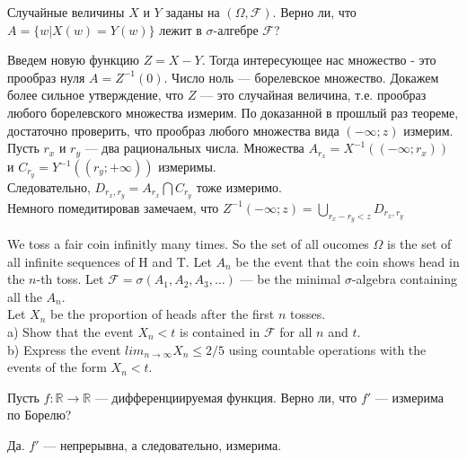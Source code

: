 \begin{problem}
Случайные величины $X$ и $Y$ заданы на $(\Omega,\mathcal{F})$. Верно ли, что $A=\{w|X(w)=Y(w)\}$ лежит в $\sigma$-алгебре $\mathcal{F}$?
\end{problem} 
\begin{solution} 

Введем новую функцию $Z=X-Y$. Тогда интересующее нас множество -
это прообраз нуля $A=Z^{-1}(0)$. Число ноль --- борелевское
множество. Докажем более сильное утверждение, что $Z$ --- это
случайная величина, т.е. прообраз любого борелевского множества
измерим. 
По доказанной в прошлый раз теореме, достаточно проверить, что
прообраз любого множества вида $(-\infty;z)$ измерим. \\
Пусть $r_{x}$ и $r_{y}$ --- два рациональных числа. Множества
$A_{r_{x}}=X^{-1}((-\infty;r_{x}))$ и
$C_{r_{y}}=Y^{-1}((r_{y};+\infty))$ измеримы. \\
Следовательно, $D_{r_{x},r_{y}}=A_{r_{x}} \bigcap C_{r_{y}}$ тоже
измеримо. \\
Немного помедитировав замечаем, что $Z^{-1}(-\infty;z)=\bigcup_{r_{x}-r_{y}<z} D_{r_{x},r_{y}}$ 
\end{solution}

\begin{problem}
We toss a fair coin infinitly many times. So the set of all oucomes $\Omega$ is the set of all infinite sequences of H and T. Let $A_{n}$ be the event that the coin shows head in the $n$-th toss. Let $\mathcal{F}=\sigma(A_{1},A_{2},A_{3},\ldots)$ --- be the minimal $\sigma$-algebra containing all the $A_{n}$. \\
Let $X_{n}$ be the proportion of heads after the first $n$ tosses.\\
a) Show that the event $X_{n}<t$ is contained in $\mathcal{F}$ for all $n$ and $t$. \\
b) Express the event $lim_{n\to\infty}X_{n}\le 2/5$ using countable operations with the events of the form $X_{n}<t$.
\end{problem} 
\begin{solution} 

\end{solution}

\begin{problem}
Пусть $f:\mathbb{R}\to\mathbb{R}$ --- дифференциируемая функция. Верно ли, что $f'$ --- измерима по Борелю?
\end{problem} 
\begin{solution} 
Да. $ f' $ --- непрерывна, а следовательно, измерима.
\end{solution}

